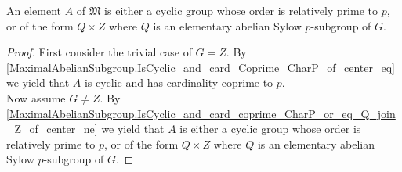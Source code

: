 \begin{theorem}
\label{MaximalAbelianSubgroup.IsCyclic_and_card_coprime_CharP_or_eq_Q_join_Z}
\leanok
An element $A$ of $\mathfrak{M}$ is either a cyclic group whose order is relatively prime to $p$, or of the form $Q \times Z$ where $Q$ is an elementary abelian Sylow $p$-subgroup of $G$. \vspace{3mm}
\end{theorem}
\begin{proof}
  First consider the trivial case of $G=Z$.
  By \ref{MaximalAbelianSubgroup.IsCyclic_and_card_Coprime_CharP_of_center_eq} we yield that $A$ is cyclic and has cardinality coprime to $p$.
  \\
  Now assume $G \neq Z$.
  By \ref{MaximalAbelianSubgroup.IsCyclic_and_card_coprime_CharP_or_eq_Q_join_Z_of_center_ne} we yield that $A$ is either a cyclic group whose order is relatively prime to $p$, or of the form $Q \times Z$ where $Q$ is an elementary abelian Sylow $p$-subgroup of $G$.
\end{proof}

